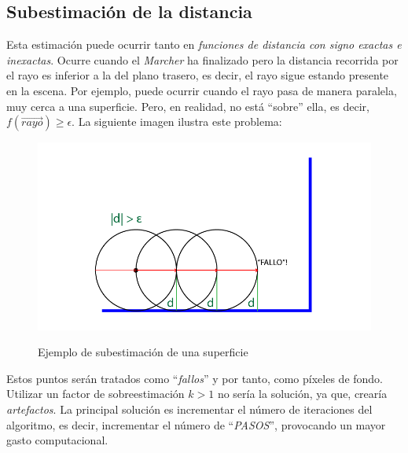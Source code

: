 \subsection{Subestimación de la distancia}
Esta estimación puede ocurrir tanto en \textit{funciones de distancia con signo exactas e inexactas}. Ocurre cuando el \textit{Marcher} ha finalizado pero la distancia recorrida por el rayo es inferior a la del plano trasero, es decir, el rayo sigue estando presente en la escena. Por ejemplo, puede ocurrir cuando el rayo pasa de manera paralela, muy cerca a una superficie. Pero, en realidad, no está \enquote{sobre} ella, es decir, \(f(\Vec{rayo}) \ge \epsilon\). La siguiente imagen ilustra este problema:

\begin{figure}[H]
  \centering
  \captionsetup{justification=centering}%
  \includegraphics[width=1.0\textwidth]{secciones/imagenes/estimation/subestimacion.png}\label{fig:subestimacion}
  \caption{Ejemplo de subestimación de una superficie}
\end{figure}

Estos puntos serán tratados como \enquote{\textit{fallos}} y por tanto, como píxeles de fondo. Utilizar un factor de sobreestimación \(k > 1\) no sería la solución, ya que, crearía \textit{artefactos}. La principal solución es incrementar el número de iteraciones del algoritmo, es decir, incrementar el número de \enquote{\textit{PASOS}}, provocando un mayor gasto computacional.